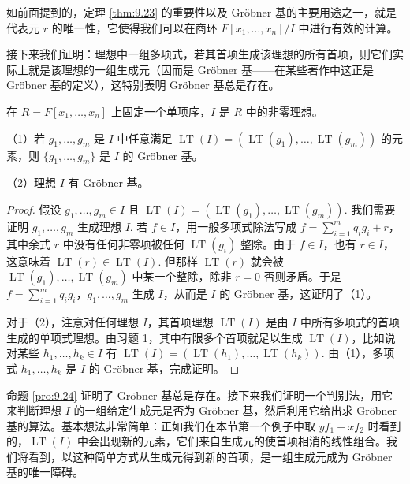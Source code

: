 如前面提到的，定理 \ref{thm:9.23} 的重要性以及 Gröbner 基的主要用途之一，就是代表元 \(r\) 的唯一性，它使得我们可以在商环 \(F[x_1, \ldots, x_n]/I\) 中进行有效的计算。

接下来我们证明：理想中一组多项式，若其首项生成该理想的所有首项，则它们实际上就是该理想的一组生成元（因而是 Gröbner 基——在某些著作中这正是 Gröbner 基的定义），这特别表明 Gröbner 基总是存在。

\begin{proposition}\label{pro:9.24}
在 \(R = F[x_1, \ldots, x_n]\) 上固定一个单项序，\(I\) 是 \(R\) 中的非零理想。

（1）若 \(g_1, \ldots, g_m\) 是 \(I\) 中任意满足 \(\operatorname{LT}(I) = (\operatorname{LT}(g_1), \ldots, \operatorname{LT}(g_m))\) 的元素，则 \(\{g_1, \ldots, g_m\}\) 是 \(I\) 的 Gröbner 基。

（2）理想 \(I\) 有 Gröbner 基。
\end{proposition}

\begin{proof}
假设 \(g_1, \ldots, g_m \in I\) 且 \(\operatorname{LT}(I) = (\operatorname{LT}(g_1), \ldots, \operatorname{LT}(g_m))\). 我们需要证明 \(g_1, \ldots, g_m\) 生成理想 \(I\). 若 \(f \in I\)，用一般多项式除法写成 \(f = \sum_{i=1}^m q_ig_i + r\)，其中余式 \(r\) 中没有任何非零项被任何 \(\operatorname{LT}(g_i)\) 整除。由于 \(f \in I\)，也有 \(r \in I\)，这意味着 \(\operatorname{LT}(r) \in \operatorname{LT}(I)\). 但那样 \(\operatorname{LT}(r)\) 就会被 \(\operatorname{LT}(g_1), \ldots, \operatorname{LT}(g_m)\) 中某一个整除，除非 \(r = 0\) 否则矛盾。于是 \(f = \sum_{i=1}^m q_ig_i\)，\(g_1, \ldots, g_m\) 生成 \(I\)，从而是 \(I\) 的 Gröbner 基，这证明了（1）。

对于（2），注意对任何理想 \(I\)，其首项理想 \(\operatorname{LT}(I)\) 是由 \(I\) 中所有多项式的首项生成的单项式理想。由习题 1，其中有限多个首项就足以生成 \(\operatorname{LT}(I)\)，比如说对某些 \(h_1, \ldots, h_k \in I\) 有 \(\operatorname{LT}(I) = (\operatorname{LT}(h_1), \ldots, \operatorname{LT}(h_k))\). 由（1），多项式 \(h_1, \ldots, h_k\) 是 \(I\) 的 Gröbner 基，完成证明。
\end{proof}

命题 \ref{pro:9.24} 证明了 Gröbner 基总是存在。接下来我们证明一个判别法，用它来判断理想 \(I\) 的一组给定生成元是否为 Gröbner 基，然后利用它给出求 Gröbner 基的算法。基本想法非常简单：正如我们在本节第一个例子中取 \(yf_1-xf_2\) 时看到的，\(\operatorname{LT}(I)\) 中会出现新的元素，它们来自生成元的使首项相消的线性组合。我们将看到，以这种简单方式从生成元得到新的首项，是一组生成元成为 Gröbner 基的唯一障碍。

